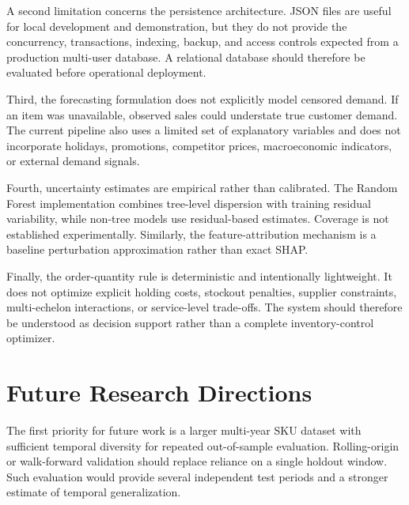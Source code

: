 \documentclass[9pt,conference]{IEEEtran}
\providecommand{\syscite}[1]{}
\begin{document}
A second limitation concerns the persistence architecture. \syscite{[cite: 1]} JSON files are useful for local development and demonstration, but they do not provide the concurrency, transactions, indexing, backup, and access controls expected from a production multi-user database. \syscite{[cite: 1]} A relational database should therefore be evaluated before operational deployment. \syscite{[cite: 1]}

Third, the forecasting formulation does not explicitly model censored demand. \syscite{[cite: 1]} If an item was unavailable, observed sales could understate true customer demand. \syscite{[cite: 1]} The current pipeline also uses a limited set of explanatory variables and does not incorporate holidays, promotions, competitor prices, macroeconomic indicators, or external demand signals. \syscite{[cite: 1]}

Fourth, uncertainty estimates are empirical rather than calibrated. \syscite{[cite: 1]} The Random Forest implementation combines tree-level dispersion with training residual variability, while non-tree models use residual-based estimates. \syscite{[cite: 1]} Coverage is not established experimentally. \syscite{[cite: 1]} Similarly, the feature-attribution mechanism is a baseline perturbation approximation rather than exact SHAP. \syscite{[cite: 1]}

Finally, the order-quantity rule is deterministic and intentionally lightweight. \syscite{[cite: 1]} It does not optimize explicit holding costs, stockout penalties, supplier constraints, multi-echelon interactions, or service-level trade-offs. \syscite{[cite: 1]} The system should therefore be understood as decision support rather than a complete inventory-control optimizer. \syscite{[cite: 1]}

\section{Future Research Directions}
The first priority for future work is a larger multi-year SKU dataset with sufficient temporal diversity for repeated out-of-sample evaluation. \syscite{[cite: 1]} Rolling-origin or walk-forward validation should replace reliance on a single holdout window. \syscite{[cite: 1]} Such evaluation would provide several independent test periods and a stronger estimate of temporal generalization. \syscite{[cite: 1]}
\end{document}
